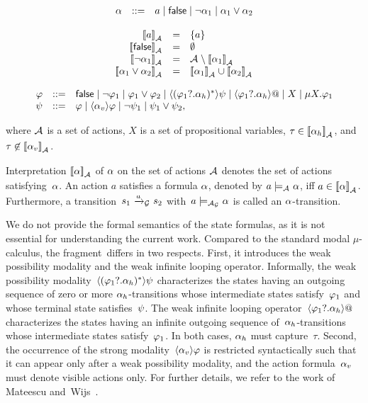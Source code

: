 \[
\begin{array}{lcl}
\alpha & {::=} & a \mid {\sf false} \mid \neg \alpha_1 \mid \alpha_1 \vee \alpha_2
\end{array}
\]

\[
\begin{array}{rcl}
\sem a \antic_{\actions{}} & = & \{ a \} \\
\sem \FALSE \antic_{\actions{}} & = & \emptyset \\
\sem \neg \Af_1 \antic_{\actions{}} & = & {\actions{}} \setminus \sem \Af_1 \antic_{\actions{}} \\
\sem \Af_1 \vee \Af_2 \antic_{\actions{}} & = & \sem \Af_1 \antic_{\actions{}} \cup \sem \Af_2 \antic_{\actions{}}
\end{array}
\]

\[
\begin{array}{rcl}
\varphi & {::=} & {\sf false}
 \mid \neg \varphi_1
 \mid \varphi_1 \vee \varphi_2
 \mid \langle (\varphi_1 ? . \alpha_h)^{*} \rangle \psi
 \mid \langle \varphi_1 ? . \alpha_h \rangle @
 \mid X
 \mid \mu X . \varphi_1 \\
\psi & {::=} & \varphi
 \mid \langle \alpha_v \rangle \varphi
 \mid \neg \psi_1
 \mid \psi_1 \vee \psi_2,
\end{array}
\]

\noindent
where ${\mathcal{A}_{}}$ is a set of actions, $X$ is a set of propositional variables, $\tau \in \left[\!\left[ \alpha_h \right]\!\right]_{{\mathcal{A}_{}}}$, and~$\tau \not\in \left[\!\left[ \alpha_v \right]\!\right]_{{\mathcal{A}_{}}}$.

Interpretation $\left[\!\left[ \alpha \right]\!\right]_{\mathcal{A}_{}}$ of $\alpha$ on the set of actions ${\mathcal{A}_{}}$ denotes the set of actions satisfying~$\alpha$.
An action $a$ satisfies a formula $\alpha$, denoted by $a \models_{\mathcal{A}_{}} \alpha$, iff $a \in \left[\!\left[ \alpha \right]\!\right]_{\mathcal{A}_{}}$.
Furthermore, a transition~$s_1\ \smash{\xrightarrow{a}_\graph}\ s_2$ with~$a \models_{\mathcal{A}_{\mathcal{G}}} \alpha$ is called an $\alpha$-transition.

We do not provide the formal semantics of the state formulas, as it is not essential for understanding the current work.
Compared to the standard modal $\mu$-calculus, the fragment~\dsbrLmu differs in two respects.
First, it introduces the weak possibility modality and the weak infinite looping operator.
Informally, the weak possibility modality~$\langle (\varphi_1 ? . \alpha_h)^{*} \rangle \psi$ characterizes the states having an outgoing sequence of zero or more $\alpha_h$-transitions whose intermediate states satisfy~$\varphi_1$ and whose terminal state satisfies~$\psi$.
The weak infinite looping operator~$\langle \varphi_1 ? . \alpha_h \rangle @$ characterizes the states having an infinite outgoing sequence of~$\alpha_h$-transitions whose intermediate states satisfy~$\varphi_1$.
In both cases, $\alpha_h$ must capture~$\tau$.
Second, the occurrence of the strong modality~$\langle \alpha_v \rangle \varphi$ is restricted syntactically such that it can appear only after a weak possibility modality, and the action formula~$\alpha_v$ must denote visible actions only.
For further details, we refer to the work of Mateescu and~Wijs~\cite{mateescu.wijs.propred}.

